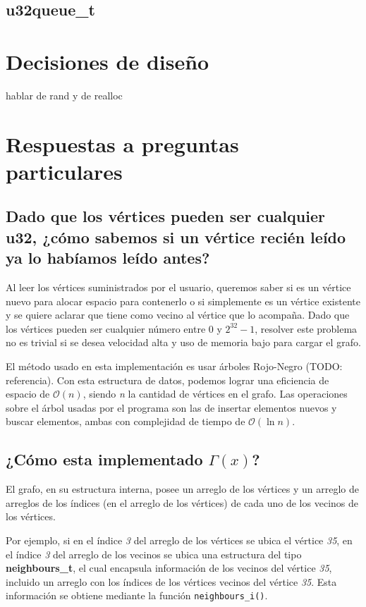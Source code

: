 \documentclass[11pt]{article}   	%
\begin{document}
\subsection{u32queue\_t}


\clearpage

\section{Decisiones de diseño}
hablar de rand y de realloc
\clearpage

\section{Respuestas a preguntas particulares}
\subsection{Dado que los vértices pueden ser cualquier u32, ¿cómo sabemos si un vértice recién leído ya
lo habíamos leído antes?}
Al leer los vértices suministrados
por el usuario, queremos saber si es un vértice nuevo para alocar espacio para contenerlo o si simplemente
es un vértice existente y se quiere aclarar que tiene como vecino al vértice que lo acompaña.
Dado que los vértices pueden ser cualquier número entre 0 y $2^{32}-1$, resolver este problema no es trivial
si se desea velocidad alta y uso de memoria bajo para cargar el grafo.

El método usado en esta implementación es usar árboles Rojo-Negro (TODO: referencia). Con esta estructura
de datos, podemos lograr una eficiencia de espacio de $\mathcal{O}(n)$, siendo \emph{n} la cantidad de
vértices en el grafo. Las operaciones sobre el árbol usadas por el programa son las de insertar elementos
nuevos y buscar elementos, ambas con complejidad de tiempo de $\mathcal{O}(\ln{n})$.

\subsection{¿Cómo esta implementado $\Gamma(x)$?}
El grafo, en su estructura interna, posee un arreglo de los vértices y un arreglo de arreglos de los
índices (en el arreglo de los vértices) de cada uno de los vecinos de los vértices.

Por ejemplo, si en el índice \emph{3} del arreglo de los vértices se ubica el vértice \emph{35}, en el
índice \emph{3} del arreglo de los vecinos se ubica una estructura del tipo \textbf{neighbours\_t}, el cual
encapsula información de los vecinos del vértice \emph{35}, incluido un arreglo con los índices de los
vértices vecinos del vértice \emph{35}. Esta información se obtiene mediante la función 
\texttt{neighbours\_i()}.
\end{document}
